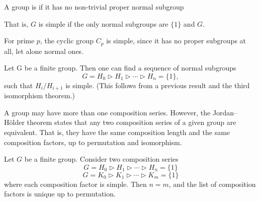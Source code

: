 \begin{definition}
A group is  if it has no non-trivial proper normal subgroup
\end{definition}

That is, $G$ is simple if the only normal subgroups are $\{1\}$ and $G$.

\begin{example}
For prime $p$, the cyclic group $C_p$ is simple, since it has no proper subgroups at all, let alone normal ones. 
\end{example}

Let G be a finite group. Then one can find a sequence of normal subgroups 
\[G=H_0\triangleright H_1\triangleright\cdots\triangleright H_n=\{1\},\]
such that $H_i/H_{i+1}$ is simple.
(This follows from a previous result and the third isomorphism theorem.)

A group may have more than one composition series. However, the Jordan--H\"{o}lder theorem states that any two composition series of a given group are equivalent. That is, they have the same composition length and the same composition factors, up to permutation and isomorphism.

\begin{theorem}
Let $G$ be a finite group. Consider two composition series
\[G=H_0\triangleright H_1\triangleright\cdots\triangleright H_n=\{1\}\]
\[G=K_0\triangleright K_1\triangleright\cdots\triangleright K_m=\{1\}\]
where each composition factor is simple.
Then $n=m$, and the list of composition factors is unique up to permutation.
\end{theorem}

